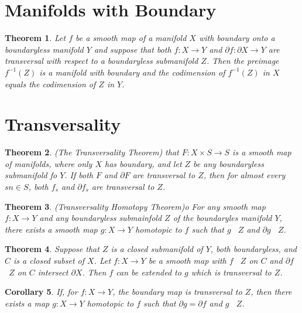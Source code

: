 \documentclass[psamsfonts]{amsart}
\newtheorem{theorem}{Theorem}[section]
\newtheorem{cor}[theorem]{Corollary}
\theoremstyle{definition}
\theoremstyle{remark}
\numberwithin{equation}{section}
\begin{document}
	\section{Manifolds with Boundary}
	\begin{theorem}
		Let $f$ be a smooth map of a manifold $X$ with boundary onto a boundaryless manifold $Y$ and suppose that both $f: X \to Y$ and $\partial f: \partial X \to Y$ are transversal with respect to a boundaryless submanifold $Z$. Then the preimage $f^{-1}(Z)$ is a manifold with boundary and the codimension of $f^{-1}(Z)$ in $X$ equals the codimension of $Z$ in $Y$.
	\end{theorem}
	
	\section{Transversality}
		\begin{theorem}(The Transversality Theorem)
			 that $F: X \times S \to S$ is a smooth map of manifolds, where only $X$ has boundary, and let $Z$ be any boundaryless submanifold fo $Y$. If both $F$ and $\partial F$ are transversal to $Z$, then for almost every $sn \in S$, both $f_s$ and $\partial f_s$ are transversal to $Z$.
		\end{theorem}
		
		\begin{theorem}(Transversality Homotopy Theorem)o
			For any smooth map $f: X \to Y$ and any boundaryless submainfold $Z$ of the boundaryles manifold $Y$, there exists a smooth map $g: X \to Y$ homotopic to $f$ such that $g$ \;\;\makebox[0pt]{$\top$}\makebox[0pt]{$\cap$}\;\ $Z$ and $\partial g$ \;\;\makebox[0pt]{$\top$}\makebox[0pt]{$\cap$}\;\ $Z$.
		\end{theorem}
		\begin{theorem}
			Suppose that $Z$ is a closed submanifold of $Y$, both boundaryless, and $C$ is a closed subset of $X$. Let $f: X \to Y$ be a smooth map with $f$ \;\;\makebox[0pt]{$\top$}\makebox[0pt]{$\cap$}\;\ $Z$ on $C$ and $\partial f$ \;\;\makebox[0pt]{$\top$}\makebox[0pt]{$\cap$}\;\ $Z$ on $C$ intersect $\partial X$. Then $f$ can be extended to $g$ which is  transversal to $Z$.
		\end{theorem}
		\begin{cor}
			If, for $f: X \to Y$, the boundary map is transversal to $Z$, then there exists a map $g: X \to Y$ homotopic to $f$ such that $\partial g = \partial f$ and $g$ \;\;\makebox[0pt]{$\top$}\makebox[0pt]{$\cap$}\;\ $Z$.
		\end{cor}
		
\end{document}
